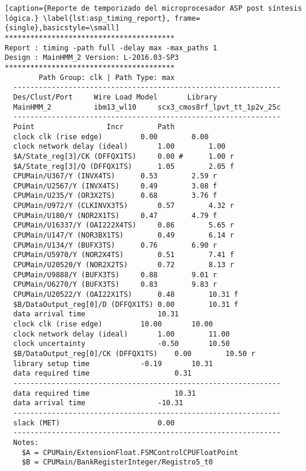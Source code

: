 \begin{lstlisting}[caption={Reporte de temporizado del microprocesador ASP post síntesis lógica.} \label{lst:asp_timing_report}, frame={single},basicstyle=\small]
****************************************
Report : timing -path full -delay max -max_paths 1
Design : MainHMM_2 Version: L-2016.03-SP3
****************************************
		Path Group: clk | Path Type: max
  ---------------------------------------------------------------
  Des/Clust/Port     Wire Load Model       Library
  MainHMM_2          ibm13_wl10     scx3_cmos8rf_lpvt_tt_1p2v_25c
  ---------------------------------------------------------------
  Point					Incr		Path
  clock clk (rise edge)			0.00		0.00
  clock network delay (ideal)		1.00		1.00
  $A/State_reg[3]/CK (DFFQX1TS)		0.00 #		1.00 r
  $A/State_reg[3]/Q (DFFQX1TS)		1.05		2.05 f
  CPUMain/U367/Y (INVX4TS)		0.53		2.59 r
  CPUMain/U2567/Y (INVX4TS)		0.49		3.08 f
  CPUMain/U235/Y (OR3X2TS)		0.68		3.76 f
  CPUMain/U972/Y (CLKINVX3TS)		0.57		4.32 r
  CPUMain/U180/Y (NOR2X1TS)		0.47		4.79 f
  CPUMain/U16337/Y (OAI222X4TS)		0.86		5.65 r
  CPUMain/U147/Y (NOR3BX1TS)		0.49		6.14 r
  CPUMain/U134/Y (BUFX3TS)		0.76		6.90 r
  CPUMain/U5970/Y (NOR2X4TS)		0.51		7.41 f
  CPUMain/U20520/Y (NOR2X2TS)		0.72		8.13 r
  CPUMain/U9888/Y (BUFX3TS)		0.88		9.01 r
  CPUMain/U6270/Y (BUFX3TS)		0.83		9.83 r
  CPUMain/U20522/Y (OAI22X1TS)		0.48		10.31 f
  $B/DataOutput_reg[0]/D (DFFQX1TS)	0.00		10.31 f
  data arrival time					10.31
  clock clk (rise edge)			10.00		10.00
  clock network delay (ideal) 		1.00		11.00
  clock uncertainty           		-0.50		10.50
  $B/DataOutput_reg[0]/CK (DFFQX1TS)	0.00		10.50 r
  library setup time			-0.19		10.31
  data required time					0.31
  ---------------------------------------------------------------
  data required time					10.31
  data arrival time					-10.31
  ---------------------------------------------------------------
  slack (MET)						0.00
  ---------------------------------------------------------------
  Notes:
  	$A = CPUMain/ExtensionFloat.FSMControlCPUFloatPoint
  	$B = CPUMain/BankRegisterInteger/Registro5_t0
\end{lstlisting}


